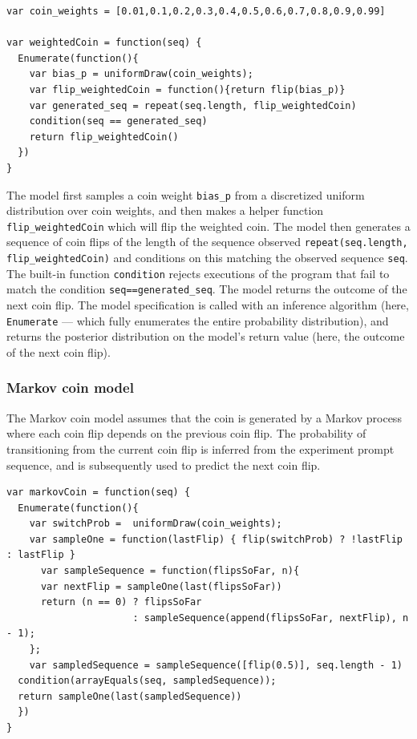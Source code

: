 \documentclass{article}
\begin{document}
\begin{lstlisting}[caption=Biased coin model,  label={lst:m_weighted}]
var coin_weights = [0.01,0.1,0.2,0.3,0.4,0.5,0.6,0.7,0.8,0.9,0.99]

var weightedCoin = function(seq) {
  Enumerate(function(){
    var bias_p = uniformDraw(coin_weights);
    var flip_weightedCoin = function(){return flip(bias_p)}
    var generated_seq = repeat(seq.length, flip_weightedCoin)
    condition(seq == generated_seq)
    return flip_weightedCoin()
  })
}
\end{lstlisting}

%
The model first samples a coin weight \lstinline{bias_p} from a discretized uniform distribution over coin weights, and
then makes a helper function \lstinline{flip_weightedCoin} which will flip the weighted coin.
The model then generates a sequence of coin flips of the length of the sequence observed \lstinline{repeat(seq.length, flip_weightedCoin)} and conditions on this matching the observed sequence \lstinline{seq}.
The built-in function \lstinline{condition} rejects executions of the program that fail to match the condition \lstinline{seq==generated_seq}.
The model returns the outcome of the next coin flip.
The model specification is called with an inference algorithm (here, \lstinline{Enumerate} --- which fully enumerates the entire probability distribution), and returns the posterior distribution on the model's return value (here, the outcome of the next coin flip).

\subsubsection{Markov coin model}
\label{s:tutorial:sss:markov}
The Markov coin model assumes that the coin is generated by a Markov process where each coin flip depends on the previous coin flip. The probability of transitioning from the current coin flip is inferred from the experiment prompt sequence, and is subsequently used to predict the next coin flip.
%
%
\begin{lstlisting}[caption=Markov coin model]
var markovCoin = function(seq) {
  Enumerate(function(){
    var switchProb =  uniformDraw(coin_weights);
    var sampleOne = function(lastFlip) { flip(switchProb) ? !lastFlip : lastFlip }
 	  var sampleSequence = function(flipsSoFar, n){
      var nextFlip = sampleOne(last(flipsSoFar))
      return (n == 0) ? flipsSoFar
                      : sampleSequence(append(flipsSoFar, nextFlip), n - 1);
	};
	var sampledSequence = sampleSequence([flip(0.5)], seq.length - 1)
  condition(arrayEquals(seq, sampledSequence));
  return sampleOne(last(sampledSequence))
  })
}
\end{lstlisting}
\end{document}
